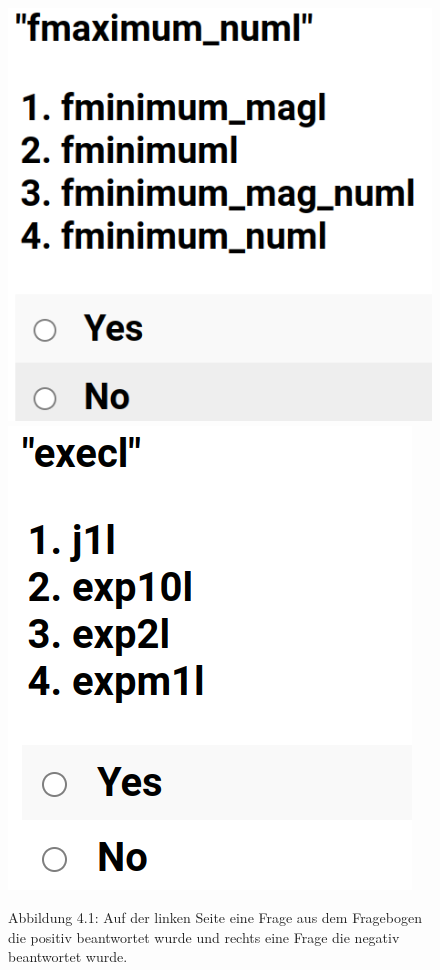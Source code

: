\documentclass[12pt,letterpaper,ngerman]{article}
\begin{document}
\begin{figure}
  \begin{center}
    \includegraphics[scale=0.3]{abb/survey-example-positive.png}
    \includegraphics[scale=0.3]{abb/survey-example-negative.png}
  \end{center}
  \captionsetup{labelformat=empty}
  \caption{
    Abbildung 4.1:
    Auf der linken Seite eine Frage aus dem Fragebogen die positiv
    beantwortet wurde und rechts eine Frage die negativ
    beantwortet wurde.
  }
\end{figure}
\end{document}

